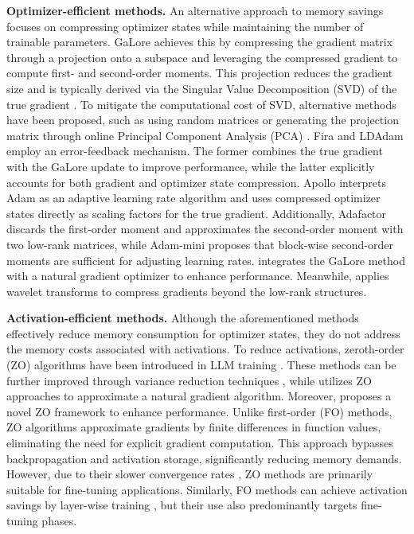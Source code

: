 \textbf{{Optimizer-efficient methods.}} An alternative approach to memory savings focuses on compressing optimizer states while maintaining the number of trainable parameters. GaLore \citep{zhao2024galore} achieves this by compressing the gradient matrix through a projection onto a subspace and leveraging the compressed gradient to compute first- and second-order moments. This projection reduces the gradient size and is typically derived via the Singular Value Decomposition (SVD) of the true gradient \citep{zhao2024galore}. To mitigate the computational cost of SVD, alternative methods have been proposed, such as using random matrices \citep{hao2024flora,he2024subspace} or generating the projection matrix through online Principal Component Analysis (PCA) \citep{liang2024memory}. {Fira \citep{chen2024fira} and LDAdam \citep{robert2024ldadam} employ an error-feedback mechanism. The former combines the true gradient with the GaLore update to improve performance, while the latter explicitly accounts for both gradient and optimizer state compression.} Apollo \citep{zhu2024apollo} interprets Adam as an adaptive learning rate algorithm and uses compressed optimizer states directly as scaling factors for the true gradient. Additionally, Adafactor \citep{shazeer2018adafactor} discards the first-order moment and approximates the second-order moment with two low-rank matrices, while Adam-mini \citep{zhang2024adam} proposes that block-wise second-order moments are sufficient for adjusting learning rates. \citep{das2024natural} integrates the GaLore method with a natural gradient optimizer to enhance performance. Meanwhile, \citet{wen2025breaking} applies wavelet transforms to compress gradients beyond the low-rank structures.

\textbf{Activation-efficient methods.} 
Although the aforementioned methods effectively reduce memory consumption for optimizer states, they do not address the memory costs associated with activations. To reduce activations, zeroth-order (ZO) algorithms have been introduced in LLM training \citep{malladi2023fine}. These methods can be further improved through variance reduction techniques \citep{gautam2024variance}, while \citet{zhao2024second} utilizes ZO approaches to approximate a natural gradient algorithm. Moreover, \citet{chen2024enhancing} proposes a novel ZO framework to enhance performance. Unlike first-order (FO) methods, ZO algorithms approximate gradients by finite differences in function values, eliminating the need for explicit gradient computation. This approach bypasses backpropagation and activation storage, significantly reducing memory demands. However, due to their slower convergence rates \citep{duchi2015optimal, nesterov2017random, berahas2022theoretical}, ZO methods are primarily suitable for fine-tuning applications. Similarly, FO methods can achieve activation savings by layer-wise training \citep{lai2024lisa}, but their use also predominantly targets fine-tuning phases.

